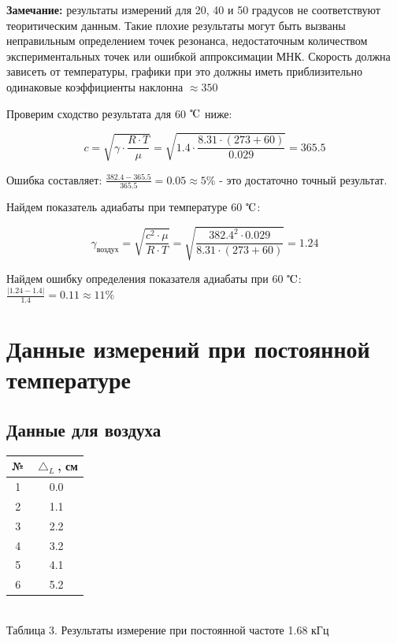 \documentclass[a4paper, 12pt]{article}
\begin{document}
\textbf{Замечание:} результаты измерений для 20, 40 и 50 градусов не соответствуют теоритическим данным. Такие плохие результаты могут быть вызваны неправильным определением точек резонанса, недостаточным количеством экспериментальных точек или ошибкой аппроксимации МНК. Скорость должна зависеть от температуры, графики при это должны иметь приблизительно одинаковые коэффициенты наклонна $\approx 350 $

Проверим сходство результата для 60 $\tccelsius$ ниже:
\begin{center}
	\begin{equation}
		c = \sqrt{\gamma \cdot \frac{R\cdot T}{\mu}} = \sqrt{1.4 \cdot \frac{8.31 \cdot (273 + 60)}{0.029}} = 365.5
	\end{equation}
\end{center}

Ошибка составляет: $\frac{382.4 - 365.5}{365.5} = 0.05 \approx 5 \%$ - это достаточно точный результат.

Найдем показатель адиабаты при температуре 60 $\tccelsius$:
	\begin{center}
		\begin{equation}
			\gamma_{\text{воздух}} = \sqrt{\frac{c^2 \cdot \mu}{R \cdot T}} = \sqrt{\frac{382.4^2 \cdot 0.029}{8.31 \cdot (273+60)}} = 1.24
		\end{equation}
	\end{center}

Найдем ошибку определения показателя адиабаты при 60 $\tccelsius$: $\frac{|1.24 - 1.4|}{1.4} = 0.11 \approx 11\%$
	
	
	\section{Данные измерений при постоянной температуре}
	\subsection[O2]{Данные для воздуха}

	\begin{center}
		\begin{tabular} {|c | c |}
			\hline	
			№ & $\bigtriangleup_L$, см\\
			\hline
			1& 0.0\\
			\hline
			 2& 1.1\\
			\hline
		 	 3& 2.2\\
			\hline
			 4& 3.2\\
			\hline
			 5& 4.1\\
			\hline
			 6& 5.2\\
			\hline
		\end{tabular}\\
		Таблица 3. Результаты измерение при постоянной частоте 1.68 кГц
	\end{center}
\end{document}
